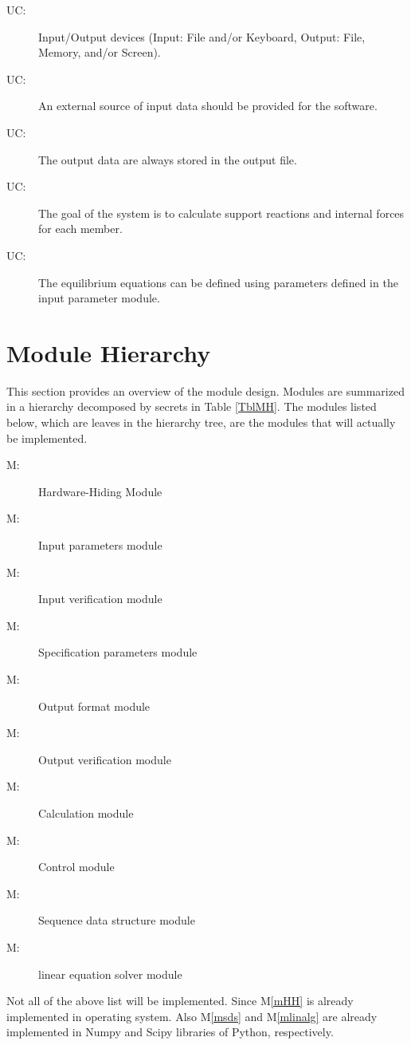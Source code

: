 \documentclass[12pt, titlepage]{article}
\newcounter{ucnum}
\newcommand{\uctheucnum}{UC\theucnum}
\newcounter{mnum}
\newcommand{\mthemnum}{M\themnum}
\begin{document}
\begin{description}
\item[ \uctheucnum \label{ucIO}:] Input/Output devices
  (Input: File and/or Keyboard, Output: File, Memory, and/or Screen).
  \item[ \uctheucnum \label{ucExternalIn}:] 
  An external source of input data should be provided for the software.
  \item[ \uctheucnum \label{ucDispaly}:] The output data are always stored in the output file.
  \item[ \uctheucnum \label{ucGoal}:] The goal of the system is to calculate support reactions and internal forces for each member.
  \item[ \uctheucnum \label{ucGoal}:] The equilibrium equations can be defined using parameters defined in the input parameter module. 

\end{description}

\section{Module Hierarchy} \label{SecMH}

This section provides an overview of the module design. Modules are summarized
in a hierarchy decomposed by secrets in Table \ref{TblMH}. The modules listed
below, which are leaves in the hierarchy tree, are the modules that will
actually be implemented.

\begin{description}
\item [ \mthemnum \label{mHH}:] Hardware-Hiding Module
\item [ \mthemnum \label{mIn}:] Input parameters module
\item [ \mthemnum \label{mparam}:] Input verification module
\item [ \mthemnum \label{mSpec}:] Specification parameters module 
\item [ \mthemnum \label{mout}:] Output format module
\item [ \mthemnum \label{mverify}:] Output verification module
\item [ \mthemnum \label{minternal}:] Calculation module
\item [ \mthemnum \label{mControl}:] Control module
\item [ \mthemnum \label{msds}:] Sequence data structure module
\item [ \mthemnum \label{mlinalg}:] linear equation solver module

\end{description} 
Not all of the above list will be implemented. Since M\ref{mHH} is already implemented in operating system. Also M\ref{msds} and  M\ref{mlinalg} are already implemented in Numpy and Scipy libraries of Python, respectively.
\end{document}
